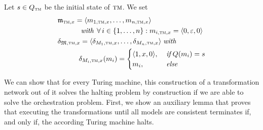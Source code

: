 Let $s \in Q_{\textsc{tm}}$ be the initial state of $\textsc{tm}$. We set
\begin{align*}
    &
    \modeltuple{m}_{\TuringMachine, x} = \tupled{\model{m}{1,\TuringMachine,x}, \dots, \model{m}{n,\TuringMachine,x}} \\
    & \formulaskip\formulaskip\formulaskip
    \withmath \forall i \in \setted{1, \dots, n} : %
    \model{m}{i, \TuringMachine, x} = \tupled{0, \varepsilon, 0} \\
    &
    \changetuple{\metamodeltuple{M},\TuringMachine,x} = \tupled{\change{\metamodel{M}{1},\TuringMachine,x}, \dots, \change{\metamodel{M}{n},\TuringMachine,x}} \withmath \\
    &
    \formulaskip\formulaskip\formulaskip
    \change{\metamodel{M}{i},\TuringMachine,x}(\model{m}{i}) = 
    \begin{cases}
        \tupled{1,x,0}, & \mathtextspacearound{if} Q(\model{m}{i}) = s\\
        \model{m}{i}, & \mathtextspacearound{else}
    \end{cases}
\end{align*}

We can show that for every Turing machine, this construction of a transformation network out of it solves the halting problem by construction if we are able to solve the orchestration problem.
First, we show an auxiliary lemma that proves that executing the transformations until all models are consistent terminates if, and only if, the according Turing machine halts.

